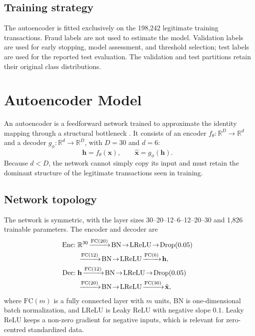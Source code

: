 \documentclass[conference]{IEEEtran}
\begin{document}
\subsection{Training strategy}
The autoencoder is fitted exclusively on the 198,242 legitimate training transactions. Fraud labels are not used to estimate the model. Validation labels are used for early stopping, model assessment, and threshold selection; test labels are used for the reported test evaluation. The validation and test partitions retain their original class distributions.

\section{Autoencoder Model}
An autoencoder is a feedforward network trained to approximate the identity mapping through a structural bottleneck \cite{sakurada2014}. It consists of an encoder $f_\theta:\mathbb{R}^{D}\to\mathbb{R}^{d}$ and a decoder $g_\phi:\mathbb{R}^{d}\to\mathbb{R}^{D}$, with $D=30$ and $d=6$:
\begin{equation}
\mathbf{h}=f_\theta(\mathbf{x}),\qquad \hat{\mathbf{x}}=g_\phi(\mathbf{h}).
\label{eq:ae}
\end{equation}
Because $d<D$, the network cannot simply copy its input and must retain the dominant structure of the legitimate transactions seen in training.

\subsection{Network topology}
The network is symmetric, with the layer sizes 30--20--12--6--12--20--30 and 1,826 trainable parameters. The encoder and decoder are
\begin{align}
\text{Enc:}\;& \mathbb{R}^{30}\!\xrightarrow{\text{FC}(20)}\!\text{BN}\!\to\!\text{LReLU}\!\to\!\text{Drop}(0.05)\notag\\
&\xrightarrow{\text{FC}(12)}\!\text{BN}\!\to\!\text{LReLU}\!\xrightarrow{\text{FC}(6)}\!\mathbf{h},\\
\text{Dec:}\;& \mathbf{h}\!\xrightarrow{\text{FC}(12)}\!\text{BN}\!\to\!\text{LReLU}\!\to\!\text{Drop}(0.05)\notag\\
&\xrightarrow{\text{FC}(20)}\!\text{BN}\!\to\!\text{LReLU}\!\xrightarrow{\text{FC}(30)}\!\hat{\mathbf{x}},
\end{align}
where $\text{FC}(m)$ is a fully connected layer with $m$ units, BN is one-dimensional batch normalization, and LReLU is Leaky ReLU with negative slope $0.1$. Leaky ReLU keeps a non-zero gradient for negative inputs, which is relevant for zero-centred standardized data.
\end{document}
